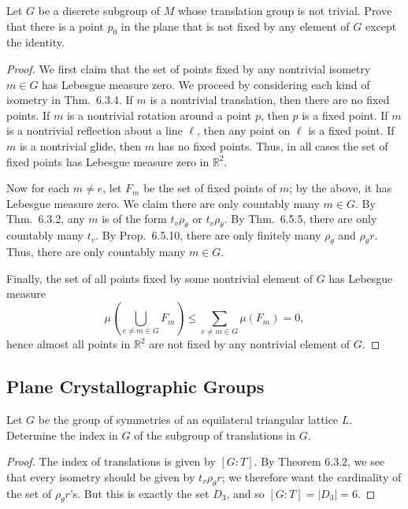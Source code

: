 \documentclass[12pt]{article}
\theoremstyle{remark}
\begin{document}
\setcounter{subsubsection}{8}
\begin{problem}
  Let $G$ be a discrete subgroup of $M$ whose translation group is not trivial. Prove that there is a point $p_0$ in the plane that is not fixed by any element of $G$ except the identity.
\end{problem}
\begin{proof}
  We first claim that the set of points fixed by any nontrivial isometry $m \in G$ has Lebesgue measure zero. We proceed by considering each kind of isometry in Thm.~$6.3.4$. If $m$ is a nontrivial translation, then there are no fixed points. If $m$ is a nontrivial rotation around a point $p$, then $p$ is a fixed point. If $m$ is a nontrivial reflection about a line $\ell$, then any point on $\ell$ is a fixed point. If $m$ is a nontrivial glide, then $m$ has no fixed points. Thus, in all cases the set of fixed points has Lebesgue measure zero in $\mathbb{R}^2$.
  \par Now for each $m \ne e$, let $F_m$ be the set of fixed points of $m$; by the above, it has Lebesgue measure zero. We claim there are only countably many $m \in G$. By Thm.~6.3.2, any $m$ is of the form $t_v\rho_\theta$ or $t_v\rho_\theta$. By Thm.~6.5.5, there are only countably many $t_v$. By Prop.~6.5.10, there are only finitely many $\rho_\theta$ and $\rho_\theta r$. Thus, there are only countably many $m \in G$.
  \par Finally, the set of all points fixed by some nontrivial element of $G$ has Lebesgue measure
  \begin{equation*}
    \mu\left( \bigcup_{e \ne m \in G} F_m \right) \le \sum_{e \ne m \in G} \mu(F_m) = 0,
  \end{equation*}
  hence almost all points in $\mathbb{R}^2$ are not fixed by any nontrivial element of $G$.
\end{proof}

\subsection{Plane Crystallographic Groups}
\setcounter{subsubsection}{1}
\begin{problem}
  Let $G$ be the group of symmetries of an equilateral triangular lattice $L$. Determine the index in $G$ of the subgroup of translations in $G$.
\end{problem}
\begin{proof}
  The index of translations is given by $[G : T]$. By Theorem $6.3.2$, we see that every isometry should be given by $t_v \rho_\theta r$; we therefore want the cardinality of the set of $\rho_\theta r$'s. But this is exactly the set $D_3$, and so $[G:T] = \lvert D_3 \rvert = 6$.
\end{proof}
\end{document}
